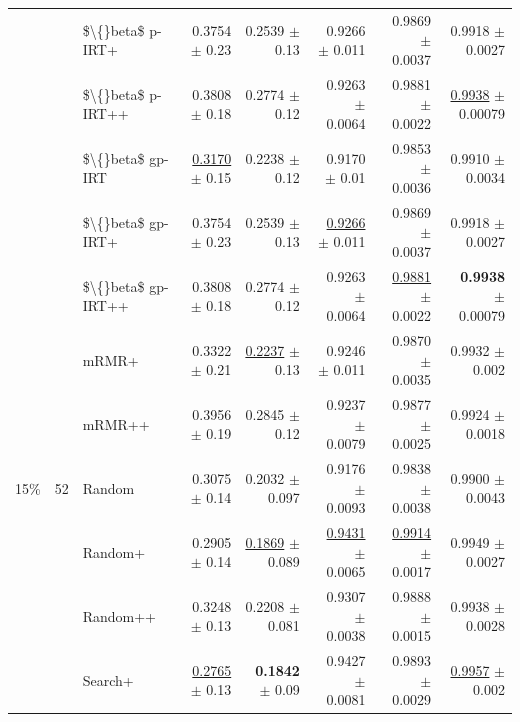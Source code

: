 \begin{longtable}{llp{}rrrrr}
 &  & \$\textbackslash\{\}beta\$ p-IRT+ & 0.3754 {\scriptsize $\pm$ 0.23} & 0.2539 {\scriptsize $\pm$ 0.13} & 0.9266 {\scriptsize $\pm$ 0.011} & 0.9869 {\scriptsize $\pm$ 0.0037} & 0.9918 {\scriptsize $\pm$ 0.0027} \\
 &  & \$\textbackslash\{\}beta\$ p-IRT++ & 0.3808 {\scriptsize $\pm$ 0.18} & 0.2774 {\scriptsize $\pm$ 0.12} & 0.9263 {\scriptsize $\pm$ 0.0064} & 0.9881 {\scriptsize $\pm$ 0.0022} & \underline{0.9938} {\scriptsize $\pm$ 0.00079} \\
 &  & \$\textbackslash\{\}beta\$ gp-IRT & \underline{0.3170} {\scriptsize $\pm$ 0.15} & 0.2238 {\scriptsize $\pm$ 0.12} & 0.9170 {\scriptsize $\pm$ 0.01} & 0.9853 {\scriptsize $\pm$ 0.0036} & 0.9910 {\scriptsize $\pm$ 0.0034} \\
 &  & \$\textbackslash\{\}beta\$ gp-IRT+ & 0.3754 {\scriptsize $\pm$ 0.23} & 0.2539 {\scriptsize $\pm$ 0.13} & \underline{0.9266} {\scriptsize $\pm$ 0.011} & 0.9869 {\scriptsize $\pm$ 0.0037} & 0.9918 {\scriptsize $\pm$ 0.0027} \\
 &  & \$\textbackslash\{\}beta\$ gp-IRT++ & 0.3808 {\scriptsize $\pm$ 0.18} & 0.2774 {\scriptsize $\pm$ 0.12} & 0.9263 {\scriptsize $\pm$ 0.0064} & \underline{0.9881} {\scriptsize $\pm$ 0.0022} & \textbf{0.9938} {\scriptsize $\pm$ 0.00079} \\
 &  & mRMR+ & 0.3322 {\scriptsize $\pm$ 0.21} & \underline{0.2237} {\scriptsize $\pm$ 0.13} & 0.9246 {\scriptsize $\pm$ 0.011} & 0.9870 {\scriptsize $\pm$ 0.0035} & 0.9932 {\scriptsize $\pm$ 0.002} \\
 &  & mRMR++ & 0.3956 {\scriptsize $\pm$ 0.19} & 0.2845 {\scriptsize $\pm$ 0.12} & 0.9237 {\scriptsize $\pm$ 0.0079} & 0.9877 {\scriptsize $\pm$ 0.0025} & 0.9924 {\scriptsize $\pm$ 0.0018} \\
\midrule
15\% & 52 & Random & 0.3075 {\scriptsize $\pm$ 0.14} & 0.2032 {\scriptsize $\pm$ 0.097} & 0.9176 {\scriptsize $\pm$ 0.0093} & 0.9838 {\scriptsize $\pm$ 0.0038} & 0.9900 {\scriptsize $\pm$ 0.0043} \\
 &  & Random+ & 0.2905 {\scriptsize $\pm$ 0.14} & \underline{0.1869} {\scriptsize $\pm$ 0.089} & \underline{0.9431} {\scriptsize $\pm$ 0.0065} & \underline{0.9914} {\scriptsize $\pm$ 0.0017} & 0.9949 {\scriptsize $\pm$ 0.0027} \\
 &  & Random++ & 0.3248 {\scriptsize $\pm$ 0.13} & 0.2208 {\scriptsize $\pm$ 0.081} & 0.9307 {\scriptsize $\pm$ 0.0038} & 0.9888 {\scriptsize $\pm$ 0.0015} & 0.9938 {\scriptsize $\pm$ 0.0028} \\
 &  & Search+ & \underline{0.2765} {\scriptsize $\pm$ 0.13} & \textbf{0.1842} {\scriptsize $\pm$ 0.09} & 0.9427 {\scriptsize $\pm$ 0.0081} & 0.9893 {\scriptsize $\pm$ 0.0029} & \underline{0.9957} {\scriptsize $\pm$ 0.002} \\

\end{longtable}
